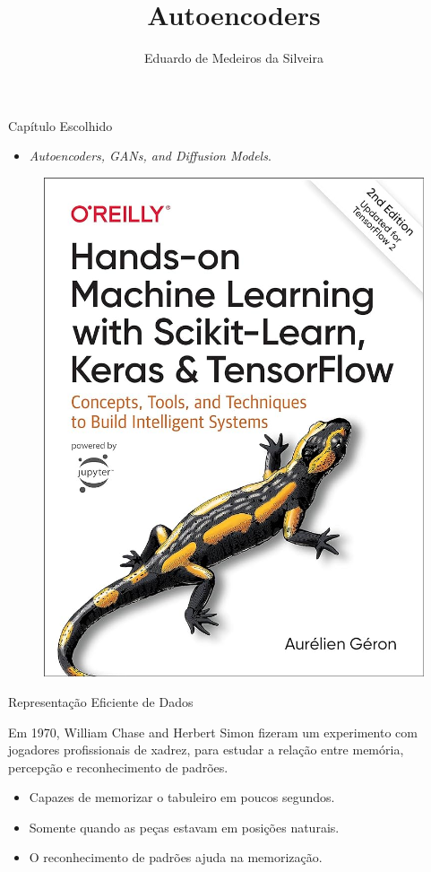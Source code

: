 \documentclass[dvipsnames]{beamer}
\title{Autoencoders}
\author{Eduardo de Medeiros da Silveira}
\institute{Universidade Federal de Santa Maria}
\date{}
\begin{document}
\frame{\titlepage}

\begin{frame}{Capítulo Escolhido}
	\begin{itemize}
		\item \emph{Autoencoders, GANs, and Diffusion Models}.
	\end{itemize}
	\begin{figure}
		\centering
		\includegraphics[scale=0.2]{img/hands-on.jpg}
	\end{figure}
\end{frame}

\begin{frame}{Representação Eficiente de Dados}

	\justifying

	Em 1970, William Chase and Herbert Simon fizeram um experimento com jogadores profissionais de xadrez, para estudar a relação entre memória, percepção e reconhecimento de padrões.

	\begin{itemize}
		\item Capazes de memorizar o tabuleiro em poucos segundos.
		\item Somente quando as peças estavam em posições naturais.
		\item O reconhecimento de padrões ajuda na memorização.
	\end{itemize}

\end{frame}
\end{document}
